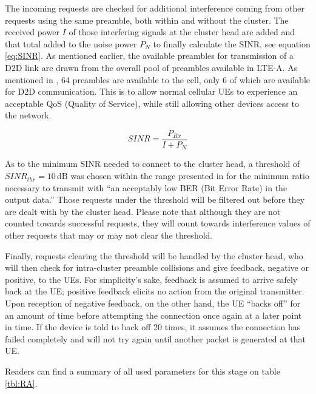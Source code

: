 The incoming requests are checked for additional interference coming from other requests using the same preamble, both within and without the cluster. The received power $I$ of those interfering signals at the cluster head are added and that total added to the noise power $P_N$ to finally calculate the SINR, see equation \ref{eq:SINR}. As mentioned earlier, the available preambles for transmission of a D2D link are drawn from the overall pool of preambles available in LTE-A. As mentioned in \cite{Cox2012}, 64 preambles are available to the cell, only 6 of which are available for D2D communication. This is to allow normal cellular UEs to experience an acceptable QoS (Quality of Service), while still allowing other devices access to the network.

\begin{equation}\label{eq:SINR}
SINR = \frac {P_{Rx}} {I + P_N}
\end{equation}

As to the minimum SINR needed to connect to the cluster head, a threshold of $SINR_{thr} = 10\,\text{dB}$ was chosen within the range presented in \cite{3Gpp2009} for the minimum ratio necessary to transmit with ``an acceptably low BER (Bit Error Rate) in the output data.'' Those requests under the threshold will be filtered out before they are dealt with by the cluster head. Please note that although they are not counted towards successful requests, they will count towards interference values of other requests that may or may not clear the threshold.

Finally, requests clearing the threshold will be handled by the cluster head, who will then check for intra-cluster preamble collisions and give feedback, negative or positive, to the UEs. For simplicity's sake, feedback is assumed to arrive safely back at the UE; positive feedback elicits no action from the original transmitter. Upon reception of negative feedback, on the other hand, the UE ``backs off'' for an amount of time before attempting the connection once again at a later point in time. If the device is told to back off 20 times, it assumes the connection has failed completely and will not try again until another packet is generated at that UE.

Readers can find a summary of all used parameters for this stage on table \ref{tbl:RA}.

